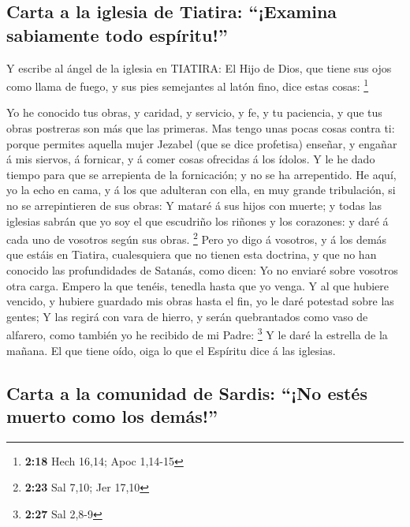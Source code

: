 \hypertarget{carta-a-la-iglesia-de-tiatira-examina-sabiamente-todo-espuxedritu}{%
\subsection{Carta a la iglesia de Tiatira: ``¡Examina sabiamente todo
espíritu!''}\label{carta-a-la-iglesia-de-tiatira-examina-sabiamente-todo-espuxedritu}}

 Y escribe al ángel de la iglesia en TIATIRA: El Hijo de
Dios, que tiene sus ojos como llama de fuego, y sus pies semejantes al
latón fino, dice estas cosas: \footnote{\textbf{2:18} Hech 16,14; Apoc
  1,14-15}

 Yo he conocido tus obras, y caridad, y servicio, y fe, y
tu paciencia, y que tus obras postreras son más que las primeras.
 Mas tengo unas pocas cosas contra ti: porque permites
aquella mujer Jezabel (que se dice profetisa) enseñar, y engañar á mis
siervos, á fornicar, y á comer cosas ofrecidas á los ídolos.
 Y le he dado tiempo para que se arrepienta de la
fornicación; y no se ha arrepentido.  He aquí, yo la echo
en cama, y á los que adulteran con ella, en muy grande tribulación, si
no se arrepintieren de sus obras:  Y mataré á sus hijos con
muerte; y todas las iglesias sabrán que yo soy el que escudriño los
riñones y los corazones: y daré á cada uno de vosotros según sus obras.
\footnote{\textbf{2:23} Sal 7,10; Jer 17,10}  Pero yo digo
á vosotros, y á los demás que estáis en Tiatira, cualesquiera que no
tienen esta doctrina, y que no han conocido las profundidades de
Satanás, como dicen: Yo no enviaré sobre vosotros otra carga.
 Empero la que tenéis, tenedla hasta que yo venga.
 Y al que hubiere vencido, y hubiere guardado mis obras
hasta el fin, yo le daré potestad sobre las gentes;  Y las
regirá con vara de hierro, y serán quebrantados como vaso de alfarero,
como también yo he recibido de mi Padre: \footnote{\textbf{2:27} Sal
  2,8-9}  Y le daré la estrella de la mañana. 
El que tiene oído, oiga lo que el Espíritu dice á las iglesias.

\hypertarget{carta-a-la-comunidad-de-sardis-no-estuxe9s-muerto-como-los-demuxe1s}{%
\subsection{Carta a la comunidad de Sardis: ``¡No estés muerto como los
demás!''}\label{carta-a-la-comunidad-de-sardis-no-estuxe9s-muerto-como-los-demuxe1s}}

